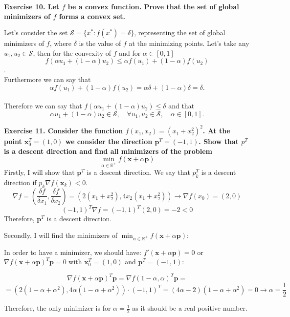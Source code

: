 \documentclass[12pt,letterpaper]{article}
\theoremstyle{definition}
\begin{document}
\textbf{Exercise 10. Let $f$ be a convex function. Prove that the set of global minimizers of $f$ forms a convex set.
} 

Let's consider the set $\mathcal{S} = \{x^* : f(x^*) = \delta \} $, representing the set of global minimizers of $f$, where $\delta$ is the value of $f$ at the minimizing points. Let's take any $u_1, u_2 \in \mathcal{S}$, then for the convexity of $f$ and for $\alpha \in [0,1]$
$$f(\alpha u_1 + (1- \alpha) u_2 )\leq \alpha f(u_1) +(1- \alpha) f(u_2)$$.
\\
Furthermore we can say that 
$$  \alpha f(u_1) +(1- \alpha) f(u_2) = \alpha \delta +(1-\alpha) \delta = \delta.$$
\\
Therefore we can say that  $ f(\alpha u_1 + (1- \alpha) u_2 )\leq \delta$ and that  $$ \alpha u_1 + (1- \alpha) u_2 \in \mathcal{S}, \quad \forall u_1, u_2 \in \mathcal{S}, \quad \alpha \in [0,1]. $$

\textbf{Exercise 11. Consider the function $f(x_1, x_2) = (x_1 + x_2^2)^2$. At the point $\textbf{x}^T_0 = (1, 0)$ we consider the direction $\textbf{p}^T = (-1, 1)$. Show that $p^T$ is a descent direction and find all minimizers of the problem}
$$\min_{\alpha\in\mathbb{R}^+} f(\textbf{x}+\alpha\textbf{p})$$
Firstly, I will show that $\textbf{p}^T$ is a descent direction. We say that $p_k^T$ is a descent direction if $p_k\nabla f(\textbf{x}_k)<0$. 
$$\nabla f=(\frac{\delta f}{\delta x_1}, \frac{\delta f}{\delta x_2})=(2(x_1+x_2^2), 4x_2(x_1+x_2^2)) \longrightarrow \nabla f(x_0)=(2,0)$$
$$(-1, 1)^T\nabla f=(-1,1)^T(2,0)=-2<0$$
Therefore, $\textbf{p}^T$ is a descent direction.

Secondly, I will find the minimizers of $\min_{\alpha\in\mathbb{R}^+} f(\textbf{x}+\alpha\textbf{p})$:

In order to have a minimizer, we should have: $f'(\textbf{x}+\alpha\textbf{p})=0$ or $\nabla f(\textbf{x}+\alpha\textbf{p})^T\textbf{p}=0$ with $\textbf{x}^T_0 = (1, 0)$ and $\textbf{p}^T = (-1, 1)$:

$$\nabla f(\textbf{x}+\alpha\textbf{p})^T\textbf{p}=\nabla f(1-\alpha,\alpha)^T\textbf{p}=$$ $$=(2(1-\alpha+\alpha^2),4\alpha(1-\alpha+\alpha^2))·(-1,1)^T=(4\alpha-2)(1-\alpha+\alpha^2)=0 \longrightarrow \alpha=\frac{1}{2}$$

Therefore, the only minimizer is for $\alpha=\frac{1}{2}$ as it should be a real positive number.

\hfill\break
\end{document}
